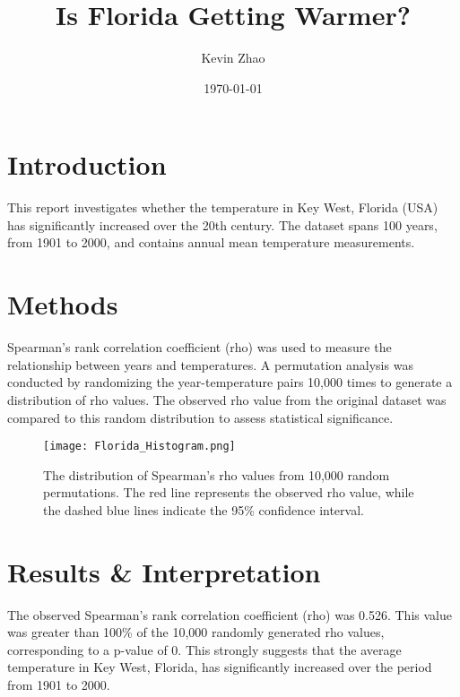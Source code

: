 \documentclass{article}
\title{\huge Is Florida Getting Warmer?}
\author{Kevin Zhao}
\date{\today}
\begin{document}
\maketitle

\section{Introduction}

This report investigates whether the temperature in Key West, Florida (USA) has significantly increased over the 20th century. The dataset spans 100 years, from 1901 to 2000, and contains annual mean temperature measurements.

\section{Methods}

Spearman's rank correlation coefficient (rho) was used to measure the relationship between years and temperatures. A permutation analysis was conducted by randomizing the year-temperature pairs 10,000 times to generate a distribution of rho values. The observed rho value from the original dataset was compared to this random distribution to assess statistical significance.

\begin{figure}[h]
    \centering
    \texttt{[image: Florida\_Histogram.png]}
    \caption{The distribution of Spearman's rho values from 10,000 random permutations. The red line represents the observed rho value, while the dashed blue lines indicate the 95\% confidence interval.}
    \label{fig:Histogram}
\end{figure}

\section{Results \& Interpretation}

The observed Spearman's rank correlation coefficient (rho) was 0.526. This value was greater than 100\% of the 10,000 randomly generated rho values, corresponding to a p-value of 0. This strongly suggests that the average temperature in Key West, Florida, has significantly increased over the period from 1901 to 2000.
\end{document}
